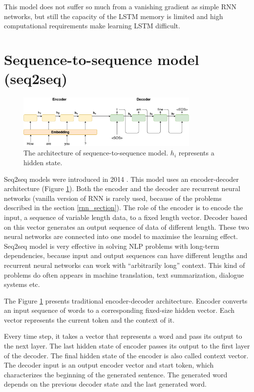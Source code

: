 This model does not suffer so much from a vanishing gradient as simple RNN networks, but still the capacity of the LSTM memory is limited and high computational requirements make learning LSTM difficult. 

\section{Sequence-to-sequence model (seq2seq)} \label{seq2seq_section}

\begin{figure}[hbt]
  \centering
  \includegraphics[width=0.8\textwidth]{figures/encoder_decoder.pdf}
  \caption{The architecture of sequence-to-sequence model. $h_i$ represents a hidden state.}
  \label{encoder_decoder}
\end{figure}

Seq2seq models were introduced in 2014 \cite{sutskever2014sequence}. This model uses an encoder-decoder architecture (Figure \ref{encoder_decoder}). Both the encoder and the decoder are recurrent neural networks (vanilla version of RNN is rarely used, because of the problems described in the section \ref{rnn_section}). The role of the encoder is to encode the input, a sequence of variable length data, to a fixed length vector. Decoder based on this vector generates an output sequence of data of different length. These two neural networks are connected into one model to maximise the learning effect. Seq2seq model is very effective in solving NLP problems with long-term dependencies, because input and output sequences can have different lengths and recurrent neural networks can work with ``arbitrarily long'' context. This kind of problems do often appears in machine translation, text summarization, dialogue systems etc.

The Figure \ref{encoder_decoder} presents traditional encoder-decoder architecture. Encoder converts an input sequence of words to a corresponding fixed-size hidden vector. Each vector represents the current token and the context of it. 

Every time step, it takes a vector that represents a word and pass its output to the next layer. The last hidden state of encoder passes its output to the first layer of the decoder. The final hidden state of the encoder is also called context vector. The decoder input is an output encoder vector and start token, which characterizes the beginning of the generated sentence. The generated word depends on the previous decoder state and the last generated word.


